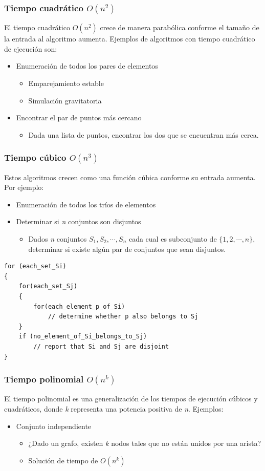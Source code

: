 \documentclass[letterpaper, 12pt]{article}
\begin{document}
\subsubsection{Tiempo cuadrático \(O(n^2)\)}
\label{sec:org089d79b}
El tiempo cuadrático \(O(n^2)\) crece de manera parabólica conforme
el tamaño de la entrada al algoritmo aumenta. Ejemplos de algoritmos con tiempo
cuadrático de ejecución son:
\begin{itemize}
\item Enumeración de todos los pares de elementos
\begin{itemize}
\item Emparejamiento estable
\item Simulación gravitatoria
\end{itemize}
\item Encontrar el par de puntos más cercano
\begin{itemize}
\item Dada una lista de puntos, encontrar los dos que se encuentran más cerca.
\end{itemize}
\end{itemize}
\subsubsection{Tiempo cúbico \(O(n^3)\)}
\label{sec:org2fa2070}
Estos algoritmos crecen como una función cúbica conforme su entrada aumenta. Por
ejemplo:
\begin{itemize}
\item Enumeración de todos los tríos de elementos
\item Determinar si \emph{n} conjuntos son disjuntos
\begin{itemize}
\item Dados \emph{n} conjuntos \(S_1, S_2, \cdots, S_n\) cada cual es subconjunto de
\(\{1, 2, \cdots, n\}\), determinar si existe algún par de conjuntos que
sean disjuntos.
\end{itemize}
\end{itemize}
\begin{verbatim}
for (each_set_Si)
{
    for(each_set_Sj)
    {
        for(each_element_p_of_Si)
            // determine whether p also belongs to Sj
    }
    if (no_element_of_Si_belongs_to_Sj)
        // report that Si and Sj are disjoint
}
\end{verbatim}
\subsubsection{Tiempo polinomial \(O(n^k)\)}
\label{sec:org1f033aa}
El tiempo polinomial es una generalización de los tiempos de ejecución cúbicos y
cuadráticos, donde \emph{k} representa una potencia positiva de \emph{n}. Ejemplos:
\begin{itemize}
\item Conjunto independiente
\begin{itemize}
\item ¿Dado un grafo, existen \emph{k} nodos tales que no están unidos por una
arista?
\item Solución de tiempo de \(O(n^k)\)
\end{itemize}
\end{itemize}
\end{document}
